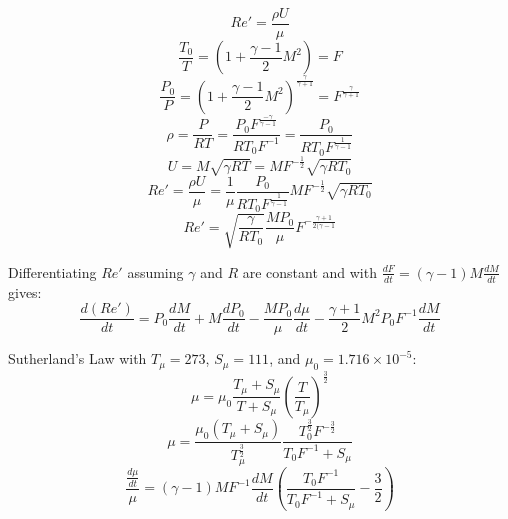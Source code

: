 \begin{equation}
    Re' = \frac{\rho U}{\mu}
\end{equation}
\begin{equation}
    \frac{T_0}{T} = (1+\frac{\gamma-1}{2}M^2) = F
\end{equation}
\begin{equation}
    \frac{P_0}{P} = (1+\frac{\gamma-1}{2}M^2)^{\frac{\gamma}{\gamma+1}} = F^{\frac{\gamma}{\gamma+1}}
\end{equation}
\begin{equation}
    \rho = \frac{P}{R T} = \frac{P_0 F^{\frac{-\gamma}{\gamma-1}}}{R T_0 F^{-1}} = \frac{P_0}{R T_0 F^{\frac{1}{\gamma-1}}}
\end{equation}
\begin{equation}
    U = M \sqrt{\gamma R T} = M F^{-\frac{1}{2}} \sqrt{\gamma R T_0}
\end{equation}
\begin{equation*}
    Re' = \frac{\rho U}{\mu} = \frac{1}{\mu} \frac{P_0}{R T_0 F^{\frac{1}{\gamma-1}}} M F^{-\frac{1}{2}} \sqrt{\gamma R T_0}
\end{equation*}
\begin{equation}
    Re' = \sqrt{\frac{\gamma}{R T_0}} \frac{M P_0}{\mu} F^{-\frac{\gamma+1}{2(\gamma -1}}
\end{equation}


\noindent Differentiating $Re'$ assuming $\gamma$ and $R$ are constant and with $\frac{dF}{dt} = (\gamma-1)M \frac{dM}{dt}$ gives:
\begin{equation}
    \frac{d(Re')}{dt} = P_0 \frac{dM}{dt} + M \frac{dP_0}{dt} - \frac{M P_0}{\mu} \frac{d\mu}{dt} - \frac{\gamma+1}{2} M^2 P_0 F^{-1} \frac{dM}{dt}
\end{equation}

\noindent Sutherland's Law with $T_\mu = 273$, $S_\mu = 111$, and $\mu_0 = 1.716 \times 10^{-5}$:
\begin{equation}
    \mu = \mu_0 \frac{T_\mu+S_\mu}{T+S_\mu} \left( \frac{T}{T_\mu} \right)^{\frac{3}{2}}
\end{equation}
\begin{equation}
    \mu = \frac{\mu_0(T_\mu+S_\mu)}{T_\mu^{\frac{3}{2}}} \frac{T_0^{\frac{3}{2}} F^{-\frac{3}{2}}}{T_0 F^{-1}+S_\mu}
\end{equation}
\begin{equation}
    \frac{\frac{d\mu}{dt}}{\mu} = (\gamma-1) M F^{-1} \frac{dM}{dt} \left( \frac{T_0 F^{-1}}{T_0 F^{-1} + S_\mu}-\frac{3}{2} \right)
\end{equation}

